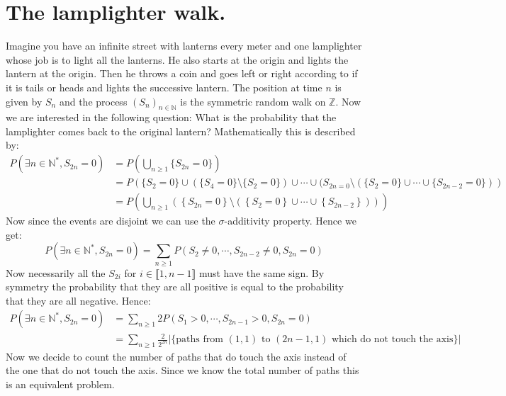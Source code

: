 \documentclass[10pt,a4paper]{book}
\theoremstyle{definition}
\begin{document}
\section{The lamplighter walk.}
Imagine you have an infinite street with lanterns every meter and one lamplighter whose job is to light all the lanterns. He also starts at the origin and lights the lantern at the origin. Then he throws a coin and goes left or right according to if it is tails or heads and lights the successive lantern. The position at time $n$ is given by $S_n$ and the process $(S_n)_{n \in \mathbb{N}}$ is the symmetric random walk on $\mathbb{Z}$. Now we are interested in the following question: What is the probability that the lamplighter comes back to the original lantern? Mathematically this is described by:
\begin{align*}
P(\exists n \in \mathbb{N}^*, S_{2n} = 0) &= P\left(\bigcup_{n \geq 1} \{ S_{2n} = 0 \} \right) \\
&= P\left(\{S_2 = 0\} \cup (\{S_4 = 0\}\setminus\{S_2 = 0\}) \cup \cdots \cup (S_{2n = 0} \setminus (\{S_2 = 0\} \cup \cdots \cup \{S_{2n - 2} = 0\} )\right)\\
&= P\left(\bigcup_{n \geq 1} \left( \left\{S_{2n} = 0\right\} \setminus \left( \left\{S_2 = 0\right\} \cup \cdots \cup \left\{ S_{2n - 2} \right\} \right) \right)\right)
\end{align*}
Now since the events are disjoint we can use the $\sigma$-additivity property. Hence we get:
\[
P(\exists n \in \mathbb{N}^*, S_{2n} = 0) = \sum_{n \geq 1} P(S_2 \neq 0, \cdots, S_{2n - 2} \neq 0, S_{2n} = 0)
\]
Now necessarily all the $S_{2i}$ for $i \in \llbracket 1, n-1\rrbracket$ must have the same sign. By symmetry the probability that they are all positive is equal to the probability that they are all negative. Hence:
\begin{align*}
P(\exists n \in \mathbb{N}^*, S_{2n} = 0) &= \sum_{n\geq 1} 2 P(S_1 > 0, \cdots, S_{2n-1} > 0, S_{2n} = 0) \\
&= \sum_{n \geq 1} \frac{2}{2^{2n}} |\{ \text{paths from } (1, 1) \text{ to } (2n -1, 1) \text{ which do not touch the axis} \}|
\end{align*}
Now we decide to count the number of paths that do touch the axis instead of the one that do not touch the axis. Since we know the total number of paths this is an equivalent problem. 
\end{document}
